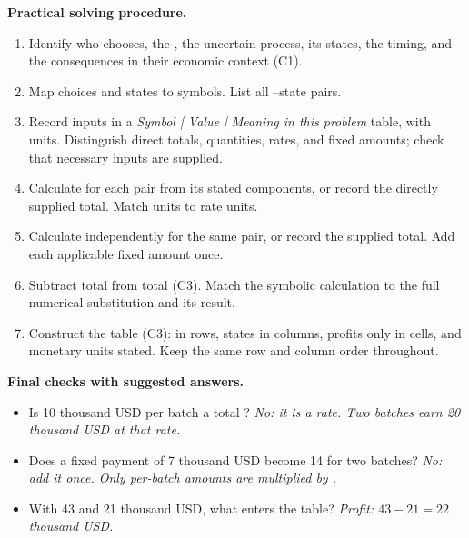 \textbf{Practical solving procedure.}
\begin{enumerate}[itemsep=2pt,parsep=0pt]
\item Identify who chooses, the , the uncertain process, its
states, the timing, and the consequences in their economic context (C1).
\item Map choices and states to symbols. List all --state pairs.
\item Record inputs in a \emph{Symbol | Value | Meaning in this problem}
table, with units. Distinguish direct totals, quantities, rates, and fixed amounts;
check that necessary inputs are supplied.
\item Calculate  for each pair from its stated components, or record
the directly supplied total. Match  units to rate units.
\item Calculate  independently for the same pair, or record the supplied
total. Add each applicable fixed amount once.
\item Subtract total  from total  (C3). Match the symbolic
calculation to the full numerical substitution and its result.
\item Construct the   table (C3):  in rows, states
in columns, profits only in cells, and monetary units stated. Keep the same
row and column order throughout.
\end{enumerate}

\textbf{Final checks with suggested answers.}
\begin{itemize}[itemsep=2pt,parsep=0pt]
\item Is 10 thousand USD per batch a total ? \textit{No: it is a
rate. Two batches earn 20 thousand USD at that rate.}
\item Does a fixed payment of 7 thousand USD become 14 for two batches?
\textit{No: add it once. Only per-batch amounts are multiplied by .}
\item With  43 and  21 thousand USD, what enters the  table?
\textit{Profit: \(43-21=22\) thousand USD.}
\end{itemize}

\clearpage
{}

